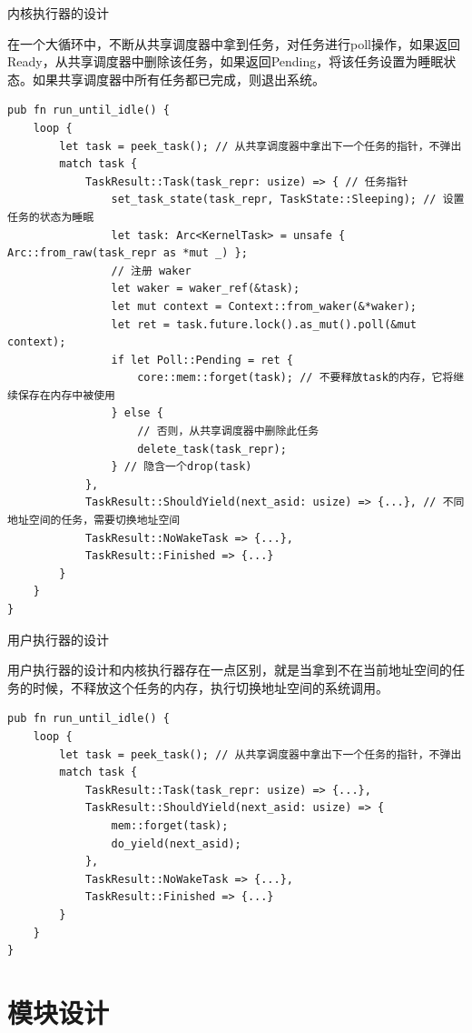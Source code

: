 内核执行器的设计

在一个大循环中，不断从共享调度器中拿到任务，对任务进行poll操作，如果返回Ready，从共享调度器中删除该任务，如果返回Pending，将该任务设置为睡眠状态。如果共享调度器中所有任务都已完成，则退出系统。

\begin{lstlisting}[caption=内核执行器的设计]
pub fn run_until_idle() {
    loop {
        let task = peek_task(); // 从共享调度器中拿出下一个任务的指针，不弹出
        match task {
            TaskResult::Task(task_repr: usize) => { // 任务指针
                set_task_state(task_repr, TaskState::Sleeping); // 设置任务的状态为睡眠
                let task: Arc<KernelTask> = unsafe { Arc::from_raw(task_repr as *mut _) };
                // 注册 waker
                let waker = waker_ref(&task);
                let mut context = Context::from_waker(&*waker);
                let ret = task.future.lock().as_mut().poll(&mut context);
                if let Poll::Pending = ret {
                    core::mem::forget(task); // 不要释放task的内存，它将继续保存在内存中被使用
                } else {
                    // 否则，从共享调度器中删除此任务
                    delete_task(task_repr);
                } // 隐含一个drop(task)
            },
            TaskResult::ShouldYield(next_asid: usize) => {...}, // 不同地址空间的任务，需要切换地址空间
            TaskResult::NoWakeTask => {...},
            TaskResult::Finished => {...}
        }
    }
}
\end{lstlisting}

用户执行器的设计

用户执行器的设计和内核执行器存在一点区别，就是当拿到不在当前地址空间的任务的时候，不释放这个任务的内存，执行切换地址空间的系统调用。

\begin{lstlisting}[caption=用户执行器的设计]
pub fn run_until_idle() {
    loop {
        let task = peek_task(); // 从共享调度器中拿出下一个任务的指针，不弹出
        match task {
            TaskResult::Task(task_repr: usize) => {...},
            TaskResult::ShouldYield(next_asid: usize) => {
                mem::forget(task);
                do_yield(next_asid);
            },
            TaskResult::NoWakeTask => {...},
            TaskResult::Finished => {...}
        }
    }
}
\end{lstlisting}

\section{模块设计}

